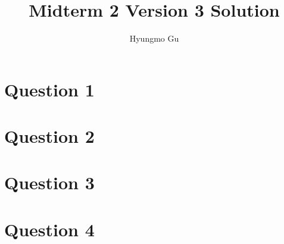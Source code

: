\documentclass[12pt]{article}
\begin{document}
\title{Midterm 2 Version 3 Solution}
\author{Hyungmo Gu}
\maketitle

\section*{Question 1}

\section*{Question 2}

\section*{Question 3}

\section*{Question 4}
\end{document}

